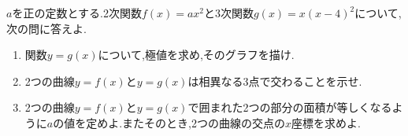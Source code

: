 \begin{problem}
$a$を正の定数とする.2次関数$f(x)=ax^2$と3次関数$g(x)=x(x-4)^2$について,次の問に答えよ.
  \begin{enumerate}[(1)\ ]
    \item 関数$y=g(x)$について,極値を求め,そのグラフを描け.
    \item 2つの曲線$y=f(x)$と$y=g(x)$は相異なる3点で交わることを示せ.
    \item 2つの曲線$y=f(x)$と$y=g(x)$で囲まれた2つの部分の面積が等しくなるように$a$の値を定めよ.またそのとき,2つの曲線の交点の$x$座標を求めよ.
  \end{enumerate}
\end{problem}
